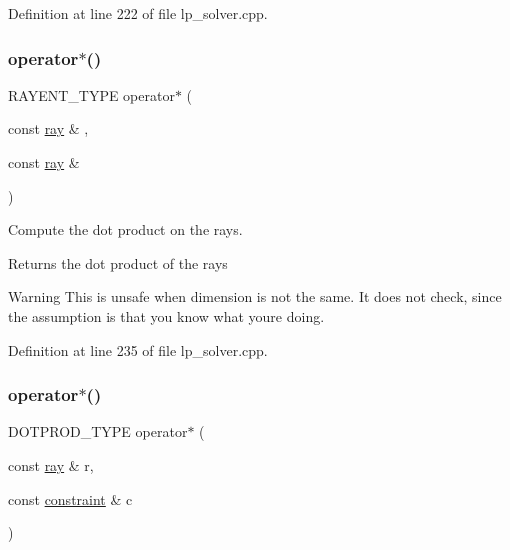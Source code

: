 Definition at line 222 of file lp\+\_\+solver.\+cpp.

\mbox{\label{group___c_l_s_solvers_ga30af4b27086e461f862e7d16e9d209df}} 
\subsubsection{\texorpdfstring{operator$\ast$()}{operator*()}\hspace{0.1cm}{\footnotesize\ttfamily [2/4]}}
{\footnotesize\ttfamily R\+A\+Y\+E\+N\+T\+\_\+\+T\+Y\+PE operator$\ast$ (\begin{DoxyParamCaption}\item[{const \hyperlink{group___c_l_s_solvers_classray}{ray} \&}]{,  }\item[{const \hyperlink{group___c_l_s_solvers_classray}{ray} \&}]{ }\end{DoxyParamCaption})}



Compute the dot product on the rays. 

\begin{DoxyReturn}{Returns}
the dot product of the rays 
\end{DoxyReturn}
\begin{DoxyWarning}{Warning}
This is unsafe when dimension is not the same. It does not check, since the assumption is that you know what you\textquotesingle{}re doing. 
\end{DoxyWarning}


Definition at line 235 of file lp\+\_\+solver.\+cpp.

\mbox{\label{group___c_l_s_solvers_gac22c25c0110c6684317aaf0e50c2e9a0}} 
\subsubsection{\texorpdfstring{operator$\ast$()}{operator*()}\hspace{0.1cm}{\footnotesize\ttfamily [3/4]}}
{\footnotesize\ttfamily D\+O\+T\+P\+R\+O\+D\+\_\+\+T\+Y\+PE operator$\ast$ (\begin{DoxyParamCaption}\item[{const \hyperlink{group___c_l_s_solvers_classray}{ray} \&}]{r,  }\item[{const \hyperlink{group___c_l_s_solvers_classconstraint}{constraint} \&}]{c }\end{DoxyParamCaption})\hspace{0.3cm}{\ttfamily [inline]}}



